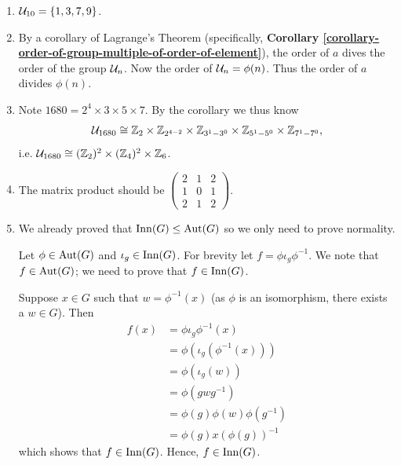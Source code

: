 \begin{enumerate}
    \item $\mathcal{U}_{10} = \{1, 3, 7, 9\}$.

    \item By a corollary of Lagrange's Theorem (specifically, \textbf{Corollary \ref{corollary-order-of-group-multiple-of-order-of-element}}), the order of $a$ dives the order of the group $\mathcal{U}_{n}$. Now the order of $\mathcal{U}_{n} = \phi(n)$. Thus the order of $a$ divides $\phi(n)$.

    \item Note $1680 = 2^4 \times 3 \times 5 \times 7$. By the corollary we thus know
    \[
        \mathcal{U}_{1680} \cong \mathbb{Z}_2 \times \mathbb{Z}_{2^{4-2}} \times \mathbb{Z}_{3^1 - 3^0} \times \mathbb{Z}_{5^1 - 5^0} \times \mathbb{Z}_{7^1 - 7^0},
    \]
    i.e. $\mathcal{U}_{1680} \cong (\mathbb{Z}_2)^2 \times (\mathbb{Z}_4)^2 \times \mathbb{Z}_6$.

    \item The matrix product should be $\begin{pmatrix}2&1&2\\1&0&1\\2&1&2\end{pmatrix}$.

    \item We already proved that $\mathrm{Inn}(G) \leq \mathrm{Aut}(G)$ so we only need to prove normality.

    Let $\phi \in \mathrm{Aut}(G)$ and $\iota_g \in \mathrm{Inn}(G)$. For brevity let $f = \phi\iota_g\phi^{-1}$. We note that $f \in \mathrm{Aut}(G)$; we need to prove that $f \in \mathrm{Inn}(G)$.

    Suppose $x \in G$ such that $w = \phi^{-1}(x)$ (as $\phi$ is an isomorphism, there exists a $w \in G$). Then
    \begin{align*}
        f(x) &= \phi\iota_g\phi^{-1}(x)\\
        &= \phi(\iota_g(\phi^{-1}(x)))\\
        &= \phi(\iota_g(w))\\
        &= \phi(gwg^{-1})\\
        &= \phi(g)\phi(w)\phi(g^{-1})\\
        &= \phi(g)x\left(\phi(g)\right)^{-1}
    \end{align*}
    which shows that $f \in \mathrm{Inn}(G)$. Hence, $f \in \mathrm{Inn}(G)$.
\end{enumerate}

